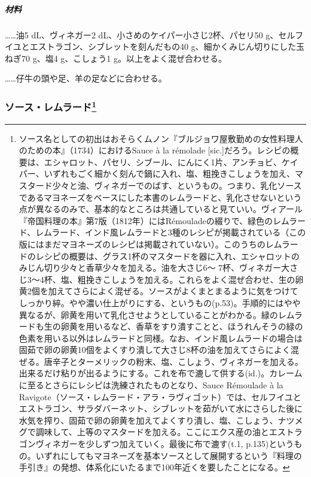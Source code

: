 \begin{recette}
\hypertarget{ux6750ux6599}{%
\subparagraph{材料}\label{ux6750ux6599}}

\ldots{}\ldots{}油5 dL、ヴィネガー2
dL、小さめのケイパー小さじ2杯、パセリ50
g、セルフイユとエストラゴン、シブレットを刻んだもの40
g、細かくみじん切りにした玉ねぎ70 g、塩4 g、こしょう1
g。以上をよく混ぜ合わせる。

\ldots{}\ldots{}仔牛の頭や足、羊の足などに合わせる。

\hypertarget{sauce-remoulade}{%
\subsubsection[ソース・レムラード]{\texorpdfstring{ソース・レムラード\footnote{ソース名としての初出はおそらくムノン『ブルジョワ屋敷勤めの女性料理人のための本』（1734）におけるSauce
  à la rémolade
  {[}sic.{]}だろう。レシピの概要は、エシャロット、パセリ、シブール、にんにく1片、アンチョビ、ケイパー、いずれもごく細かく刻んで鍋に入れ、塩、粗挽きこしょうを加え、マスタード少々と油、ヴィネガーでのばす、というもの。つまり、乳化ソースであるマヨネーズをベースにした本書のレムラードと、乳化させないという点が異なるのみで、基本的なところは共通していると見ていい。ヴィアール『帝国料理の本』第7版（1812年）にはRémouladeの綴りで、緑色のレムラード、レムラード、インド風レムラードと3種のレシピが掲載されている（この版にはまだマヨネーズのレシピは掲載されていない）。このうちのレムラードのレシピの概要は、グラス1杯のマスタードを器に入れ、エシャロットのみじん切り少々と香草少々を加える。油を大さじ6〜
  7杯、ヴィネガー大さじ3〜4杯、塩、粗挽きこしょうを加える。これらをよく混ぜ合わせ、生の卵黄2個を加えてさらによく混ぜる。ソースがよくまとまるように気をつけてしっかり綷。やや濃い仕上がりにする、というもの(p.53)。手順的にはやや異なるが、卵黄を用いて乳化させようとしていることがわかる。緑のレムラードも生の卵黄を用いるなど、香草をすり潰すことと、ほうれんそうの緑の色素を用いる以外はレムラードと同様。なお、インド風レムラードの場合は固茹で卵の卵黄10個をよくすり潰して大さじ8杯の油を加えてさらによく混ぜる。唐辛子とターメリックの粉末、塩、こしょう、ヴィネガーを加える。出来るだけ粘りが出るようにする。これを布で漉して供する(id.)。カレームに至るとさらにレシピは洗練されたものとなり、Sauce
  Rémoulade à la
  Ravigote（ソース・レムラード・アラ・ラヴィゴット）では、セルフイユとエストラゴン、サラダバーネット、シブレットを茹がいて水にさらした後に水気を搾り、固茹で卵の卵黄を加えてよくすり潰し、塩、こしょう、ナツメグで調味して、上等のマスタードを加える。ここにエクス産の油とエストラゴンヴィネガーを少しずつ加えていく。最後に布で漉す(t.1,
  p.135)というもの。いずれにしてもマヨネーズを基本ソースとして展開するという『料理の手引き』の発想、体系化にいたるまで100年近くを要したことになる。}}{ソース・レムラード}}\label{sauce-remoulade}}


\end{recette}
